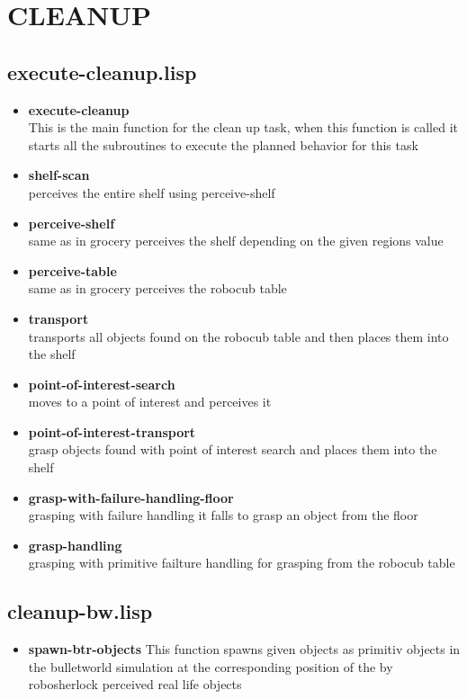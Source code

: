 \documentclass[main.tex]{subfiles}
\begin{document}
	  	\section{CLEANUP}
	  	\subsection{execute-cleanup.lisp}
	  	\begin{itemize}
			\item \textbf{execute-cleanup} \\
			This is the main function for the clean up task, when this function is called it starts all the subroutines to execute the planned behavior for this task
			\item \textbf{shelf-scan} \\
			perceives the entire shelf using perceive-shelf
			\item \textbf{perceive-shelf} \\
			same as in grocery perceives the shelf depending on the given regions value
			\item \textbf{perceive-table} \\
			same as in grocery perceives the robocub table
			\item \textbf{transport} \\
            transports all objects found on the robocub table and then places them into the shelf
			\item \textbf{point-of-interest-search} \\
			moves to a point of interest and perceives it 
			\item \textbf{point-of-interest-transport} \\
			grasp objects found with point of interest search and places them into the shelf
			\item \textbf{grasp-with-failure-handling-floor} \\
			grasping with failure handling it falls to grasp an object from the floor
			\item \textbf{grasp-handling}\\
			grasping with primitive failture handling for grasping from the robocub table
		\end{itemize}

	    \subsection{cleanup-bw.lisp}
		\begin{itemize}
			\item \textbf{spawn-btr-objects}
			This function spawns given objects as primitiv objects in the bulletworld simulation at the corresponding position of the by robosherlock perceived real life objects  
		\end{itemize}
	  	
\end{document}
